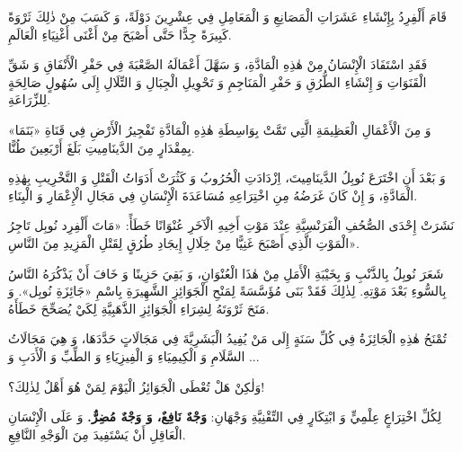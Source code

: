\begin{JNass}
قَامَ أَلْفِرِدُ بِإِنْشَاءِ عَشَرَاتِ الْمَصَانِعِ وَ الْمَعَامِلِ فِي عِشْرِينَ
دَوْلَةً، وَ كَسَبَ مِنْ ذٰلِكَ ثَرْوَةً كَبِيرَةً جِدًّا حَتَّى أَصْبَحَ مِنْ
أَغْنَى أَغْنِيَاءِ الْعَالَمِ.

فَقَدِ اسْتَفَادَ الْإِنْسَانُ مِنْ هٰذِهِ الْمَادَّةِ، وَ سَهَّلَ أَعْمَالَهُ
الصَّعْبَةَ فِي حَفْرِ الْأَنْفَاقِ وَ شَقِّ الْقَنَوَاتِ وَ إِنْشَاءِ
الطُّرُقِ وَ حَفْرِ الْمَنَاجِمِ وَ تَحْوِيلِ الْجِبَالِ وَ التِّلَالِ إِلَى
سُهُولٍ صَالِحَةٍ لِلزِّرَاعَةِ.

وَ مِنَ الْأَعْمَالِ الْعَظِيمَةِ الَّتِي تَمَّتْ بِوَاسِطَةِ هٰذِهِ الْمَادَّةِ
تَفْجِيرُ الْأَرْضِ فِي قَنَاةِ «بَنَمَا» بِمِقْدَارٍ مِنَ الدَّينَامِيتِ بَلَغَ
أَرْبَعِينَ طُنًّا.

وَ بَعْدَ أَنِ اخْتَرَعَ نُوبِلُ الدَّينَامِيتَ، اِزْدَادَتِ الْحُرُوبُ وَ
كَثُرَتْ أَدَوَاتُ الْقَتْلِ وَ التَّخْرِيبِ بِهٰذِهِ الْمَادَّةِ، وَ إِنْ كَانَ
غَرَضُهُ مِنِ اخْتِرَاعِهِ مُسَاعَدَةَ الْإِنْسَانِ فِي مَجَالِ الْإِعْمَارِ وَ
الْبِنَاءِ.
\end{JNass}

\begin{JNass}
نَشَرَتْ إِحْدَى الصُّحُفِ الْفَرَنْسِيَّةِ عِنْدَ مَوْتِ أَخِيهِ الْآخَرِ
عُنْوَانًا خَطَأً: «مَاتَ أَلْفِرِد نُوبِل تَاجِرُ الْمَوْتِ الَّذِي أَصْبَحَ
غَنِيًّا مِنْ خِلَالِ إِيجَادِ طُرُقٍ لِقَتْلِ الْمَزِيدِ مِنَ النَّاسِ».

شَعَرَ نُوبِلُ بِالذَّنْبِ وَ بِخَيْبَةِ الْأَمَلِ مِنْ هٰذَا الْعُنْوَانِ، وَ
بَقِيَ حَزِينًا وَ خَافَ أَنْ يَذْكُرَهُ النَّاسُ بِالسُّوءِ بَعْدَ مَوْتِهِ.
لِذٰلِكَ فَقَدْ بَنَى مُؤَسَّسَةً لِمَنْحِ الْجَوَائِزِ الشَّهِيرَةِ بِاسْمِ
«جَائِزَةِ نُوبِل». وَ مَنَحَ ثَرْوَتَهُ لِشِرَاءِ الْجَوَائِزِ الذَّهَبِيَّةِ
لِكَيْ يُصَحِّحَ خَطَأَهُ.

تُمْنَحُ هٰذِهِ الْجَائِزَةُ فِي كُلِّ سَنَةٍ إِلَى مَنْ يُفِيدُ الْبَشَرِيَّةَ
فِي مَجَالَاتٍ حَدَّدَهَا، وَ هِيَ مَجَالَاتُ السَّلَامِ وَ الْكِيمِيَاءِ وَ
الْفِيزِيَاءِ وَ الطِّبِّ وَ الْأَدَبِ وَ ...

وَلٰكِنْ هَلْ تُعْطَى الْجَوَائِزُ الْيَوْمَ لِمَنْ هُوَ أَهْلٌ لِذٰلِكَ؟!

لِكُلِّ اخْتِرَاعٍ عِلْمِيٍّ وَ ابْتِكَارٍ فِي التِّقْنِيَّةِ وَجْهَانِ:
{\Ar\bfseries وَجْهٌ نَافِعٌ، وَ وَجْهٌ مُضِرٌّ.}
وَ عَلَى الْإِنْسَانِ الْعَاقِلِ أَنْ يَسْتَفِيدَ مِنَ الْوَجْهِ النَّافِعِ.
\end{JNass}

